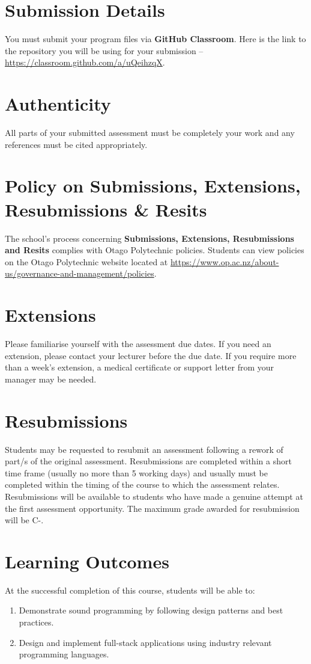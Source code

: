 \documentclass{article}
\begin{document}
\section*{Submission Details}
You must submit your program files via \textbf{GitHub Classroom}. Here is the link to the repository you will be using for your submission – \href{https://classroom.github.com/a/uQeihzqX}{https://classroom.github.com/a/uQeihzqX}.

\section*{Authenticity}
All parts of your submitted assessment must be completely your work and any references must be cited appropriately.

\section*{Policy on Submissions, Extensions, Resubmissions \& Resits}
The school's process concerning \textbf{Submissions, Extensions, Resubmissions and Resits} complies with Otago Polytechnic policies. Students can view policies on the Otago Polytechnic website located at \href{https://www.op.ac.nz/about-us/governance-and-management/policies}{https://www.op.ac.nz/about-us/governance-and-management/policies}.

\section*{Extensions}
Please familiarise yourself with the assessment due dates. If you need an extension, please contact your lecturer before the due date. If you require more than a week's extension, a medical certificate or support letter from your manager may be needed.

\section*{Resubmissions}
Students may be requested to resubmit an assessment following a rework of part/s of the original assessment. Resubmissions are completed within a short time frame (usually no more than 5 working days) and usually must be completed within the timing of the course to which the assessment relates. Resubmissions will be available to students who have made a genuine attempt at the first assessment opportunity. The maximum grade awarded for resubmission will be C-.

\section*{Learning Outcomes}
At the successful completion of this course, students will be able to:
\begin{enumerate}
	\item Demonstrate sound programming by following design patterns and best practices.
	\item Design and implement full-stack applications using industry relevant programming languages.
\end{enumerate}
\end{document}
